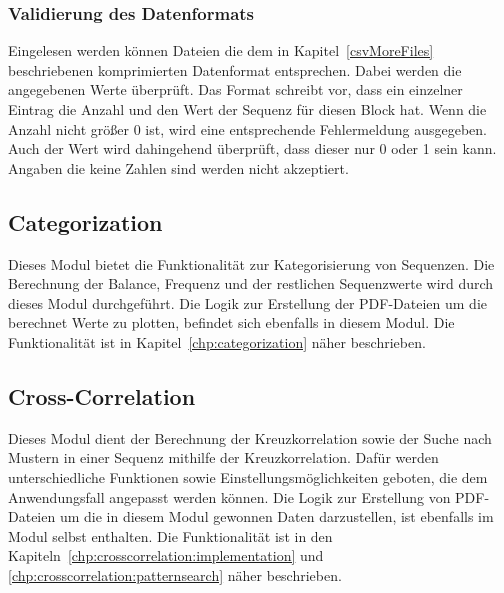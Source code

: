 \subsubsection{Validierung des Datenformats}
Eingelesen werden können Dateien die dem in Kapitel~\ref{csvMoreFiles} beschriebenen komprimierten Datenformat entsprechen.
Dabei werden die angegebenen Werte überprüft.
Das Format schreibt vor, dass ein einzelner Eintrag die Anzahl und den Wert der Sequenz für diesen Block hat.
Wenn die Anzahl nicht größer 0 ist, wird eine entsprechende Fehlermeldung ausgegeben.
Auch der Wert wird dahingehend überprüft, dass dieser nur 0 oder 1 sein kann.
Angaben die keine Zahlen sind werden nicht akzeptiert. 

\subsection{Categorization}
Dieses Modul bietet die Funktionalität zur Kategorisierung von Sequenzen.
Die Berechnung der Balance, Frequenz und der restlichen Sequenzwerte wird durch dieses Modul durchgeführt.
Die Logik zur Erstellung der PDF-Dateien um die berechnet Werte zu plotten, befindet sich ebenfalls in diesem Modul.
Die Funktionalität ist in Kapitel~\ref{chp:categorization} näher beschrieben.

\subsection{Cross-Correlation}
Dieses Modul dient der Berechnung der Kreuzkorrelation sowie der Suche nach Mustern in einer Sequenz mithilfe der Kreuzkorrelation.
Dafür werden unterschiedliche Funktionen sowie Einstellungsmöglichkeiten geboten, die dem Anwendungsfall angepasst werden können.
Die Logik zur Erstellung von PDF-Dateien um die in diesem Modul gewonnen Daten darzustellen, ist ebenfalls im Modul selbst enthalten.
Die Funktionalität ist in den Kapiteln~\ref{chp:crosscorrelation:implementation} und \ref{chp:crosscorrelation:patternsearch} näher beschrieben.